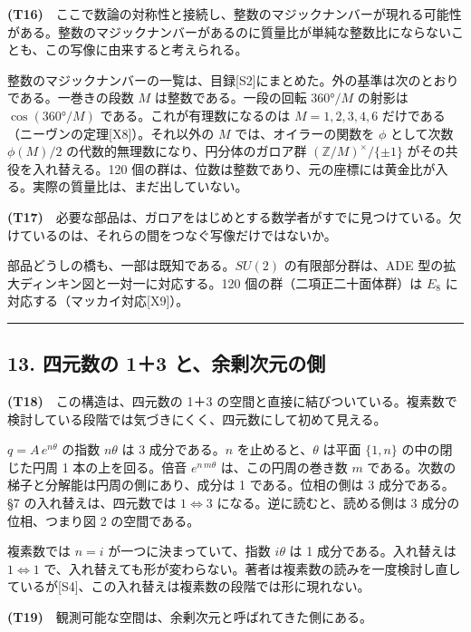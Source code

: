 \documentclass[
  a4paper,
]{ltjsarticle}
\begin{document}
\textbf{(T16)}　ここで数論の対称性と接続し、整数のマジックナンバーが現れる可能性がある。整数のマジックナンバーがあるのに質量比が単純な整数比にならないことも、この写像に由来すると考えられる。

整数のマジックナンバーの一覧は、目録{[}S2{]}にまとめた。外の基準は次のとおりである。一巻きの段数
\(M\) は整数である。一段の回転 \(360°/M\) の射影は \(\cos(360°/M)\)
である。これが有理数になるのは \(M=1,2,3,4,6\)
だけである（ニーヴンの定理{[}X8{]}）。それ以外の \(M\)
では、オイラーの関数を \(\phi\) として次数 \(\phi(M)/2\)
の代数的無理数になり、円分体のガロア群
\((\mathbb{Z}/M)^{\times}/\{\pm1\}\) がその共役を入れ替える。120
個の群は、位数は整数であり、元の座標には黄金比が入る。実際の質量比は、まだ出していない。

\textbf{(T17)}　必要な部品は、ガロアをはじめとする数学者がすでに見つけている。欠けているのは、それらの間をつなぐ写像だけではないか。

部品どうしの橋も、一部は既知である。\(SU(2)\) の有限部分群は、ADE
型の拡大ディンキン図と一対一に対応する。120 個の群（二項正二十面体群）は
\(E_8\) に対応する（マッカイ対応{[}X9{]}）。

\begin{center}\rule{0.5\linewidth}{0.5pt}\end{center}

\subsection{13. 四元数の 1＋3
と、余剰次元の側}\label{ux56dbux5143ux6570ux306e-13-ux3068ux4f59ux5270ux6b21ux5143ux306eux5074}

\textbf{(T18)}　この構造は、四元数の 1＋3
の空間と直接に結びついている。複素数で検討している段階では気づきにくく、四元数にして初めて見える。

\(q=A\,e^{n\theta}\) の指数 \(n\theta\) は 3 成分である。\(n\)
を止めると、\(\theta\) は平面 \(\{1,n\}\) の中の閉じた円周 1
本の上を回る。倍音 \(e^{n\,m\theta}\) は、この円周の巻き数 \(m\)
である。次数の梯子と分解能は円周の側にあり、成分は 1 である。位相の側は
3 成分である。§7 の入れ替えは、四元数では \(1\Leftrightarrow3\)
になる。逆に読むと、読める側は 3 成分の位相、つまり図 2 の空間である。

複素数では \(n=i\) が一つに決まっていて、指数 \(i\theta\) は 1
成分である。入れ替えは \(1\Leftrightarrow1\)
で、入れ替えても形が変わらない。著者は複素数の読みを一度検討し直しているが{[}S4{]}、この入れ替えは複素数の段階では形に現れない。

\textbf{(T19)}　観測可能な空間は、余剰次元と呼ばれてきた側にある。
\end{document}
